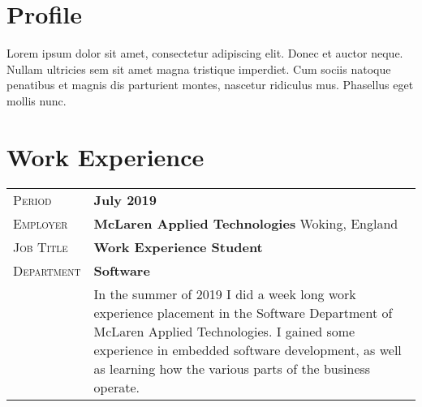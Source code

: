 \documentclass[a4paper, oneside, final]{scrartcl}
\newcommand{\gray}{\rowcolor[gray]{.90}}
\begin{document}
\begin{center} %


{\fontsize{36}{36}\selectfont\scshape{}}

\vspace{1.5cm} %


\section{Profile}

Lorem ipsum dolor sit amet, consectetur adipiscing elit. Donec et auctor neque.
Nullam ultricies sem sit amet magna tristique imperdiet. Cum sociis natoque
penatibus et magnis dis parturient montes, nascetur ridiculus mus. Phasellus
eget mollis nunc.


\section{Work Experience}

\begin{tabularx}{0.97\linewidth}{>{\raggedleft\scshape}p{2.5cm}X}
\gray Period & \textbf{July 2019}\\
\gray Employer & \textbf{McLaren Applied Technologies} \hfill Woking, England\\
\gray Job Title & \textbf{Work Experience Student}\\
\gray Department & \textbf{Software}\\
& In the summer of 2019 I did a week long work experience placement in the
Software Department of McLaren Applied Technologies. I gained some experience
in embedded software development, as well as learning how the various parts of
the business operate.
\end{tabularx}


\end{center}
\end{document}
